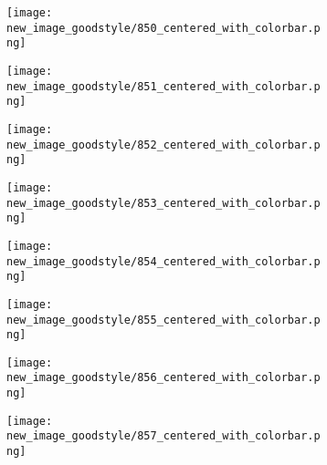 \documentclass[a4paper,12pt]{article}
\begin{document}
\begin{figure}[H]
  \begin{subfigure}{0.11\textwidth}
    \texttt{[image: new\_image\_goodstyle/850\_centered\_with\_colorbar.png]}
  \end{subfigure}
  \hfill
  \begin{subfigure}{0.11\textwidth}
    \texttt{[image: new\_image\_goodstyle/851\_centered\_with\_colorbar.png]}
  \end{subfigure}
  \hfill
  \begin{subfigure}{0.11\textwidth}
    \texttt{[image: new\_image\_goodstyle/852\_centered\_with\_colorbar.png]}
  \end{subfigure}
  \hfill
  \begin{subfigure}{0.11\textwidth}
    \texttt{[image: new\_image\_goodstyle/853\_centered\_with\_colorbar.png]}
  \end{subfigure}
  \hfill
  \begin{subfigure}{0.11\textwidth}
    \texttt{[image: new\_image\_goodstyle/854\_centered\_with\_colorbar.png]}
  \end{subfigure}
  \hfill
  \begin{subfigure}{0.11\textwidth}
    \texttt{[image: new\_image\_goodstyle/855\_centered\_with\_colorbar.png]}
  \end{subfigure}
  \hfill
  \begin{subfigure}{0.11\textwidth}
    \texttt{[image: new\_image\_goodstyle/856\_centered\_with\_colorbar.png]}
  \end{subfigure}
  \hfill
  \begin{subfigure}{0.11\textwidth}
    \texttt{[image: new\_image\_goodstyle/857\_centered\_with\_colorbar.png]}
  \end{subfigure}
  \hfill
\end{figure}
\end{document}
